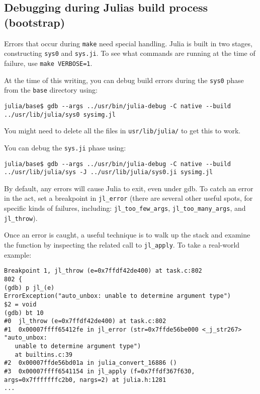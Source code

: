 \hypertarget{8144212274800572894}{}


\subsection{Debugging during Julia{\textquotesingle}s build process (bootstrap)}



Errors that occur during \texttt{make} need special handling. Julia is built in two stages, constructing \texttt{sys0} and \texttt{sys.ji}. To see what commands are running at the time of failure, use \texttt{make VERBOSE=1}.



At the time of this writing, you can debug build errors during the \texttt{sys0} phase from the \texttt{base} directory using:




\begin{lstlisting}
julia/base$ gdb --args ../usr/bin/julia-debug -C native --build ../usr/lib/julia/sys0 sysimg.jl
\end{lstlisting}



You might need to delete all the files in \texttt{usr/lib/julia/} to get this to work.



You can debug the \texttt{sys.ji} phase using:




\begin{lstlisting}
julia/base$ gdb --args ../usr/bin/julia-debug -C native --build ../usr/lib/julia/sys -J ../usr/lib/julia/sys0.ji sysimg.jl
\end{lstlisting}



By default, any errors will cause Julia to exit, even under gdb. To catch an error {\textquotedbl}in the act{\textquotedbl}, set a breakpoint in \texttt{jl\_error} (there are several other useful spots, for specific kinds of failures, including: \texttt{jl\_too\_few\_args}, \texttt{jl\_too\_many\_args}, and \texttt{jl\_throw}).



Once an error is caught, a useful technique is to walk up the stack and examine the function by inspecting the related call to \texttt{jl\_apply}. To take a real-world example:




\begin{lstlisting}
Breakpoint 1, jl_throw (e=0x7ffdf42de400) at task.c:802
802 {
(gdb) p jl_(e)
ErrorException("auto_unbox: unable to determine argument type")
$2 = void
(gdb) bt 10
#0  jl_throw (e=0x7ffdf42de400) at task.c:802
#1  0x00007ffff65412fe in jl_error (str=0x7ffde56be000 <_j_str267> "auto_unbox:
   unable to determine argument type")
   at builtins.c:39
#2  0x00007ffde56bd01a in julia_convert_16886 ()
#3  0x00007ffff6541154 in jl_apply (f=0x7ffdf367f630, args=0x7fffffffc2b0, nargs=2) at julia.h:1281
...
\end{lstlisting}



